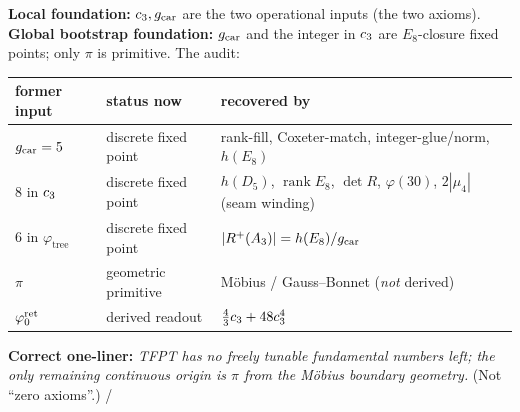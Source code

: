 \begin{keybox}
\textbf{Local foundation:} $c_3,g_{\mathrm{car}}$ are the two operational inputs (the two axioms).
\textbf{Global bootstrap foundation:} $g_{\mathrm{car}}$ and the integer in $c_3$ are $E_8$-closure fixed
points; only $\pi$ is primitive. The audit:
\begin{center}\small\renewcommand{\arraystretch}{1.2}
\begin{tabularx}{\linewidth}{@{}p{2.3cm}p{4.1cm}Y@{}}
\toprule
\textbf{former input} & \textbf{status now} & \textbf{recovered by} \\
\midrule
$g_{\mathrm{car}}=5$ & discrete fixed point & rank-fill, Coxeter-match, integer-glue/norm, $h(E_8)$ \\
$8$ in $c_3$ & discrete fixed point & $h(D_5)$, $\operatorname{rank}E_8$, $\det R$, $\varphi(30)$, $2|\mu_4|$ (seam winding) \\
$6$ in $\varphi_{\mathrm{tree}}$ & discrete fixed point & $|R^+(A_3)|=h(E_8)/g_{\mathrm{car}}$ \\
$\pi$ & geometric primitive & Möbius / Gauss--Bonnet (\emph{not} derived) \\
$\varphi_0^{\mathrm{ret}}$ & derived readout & $\tfrac43c_3+48c_3^4$ \\
\bottomrule
\end{tabularx}
\end{center}
\textbf{Correct one-liner:} \emph{TFPT has no freely tunable fundamental numbers left; the only remaining
continuous origin is $\pi$ from the Möbius boundary geometry.} (Not ``zero axioms''.) \mE/\mO
\end{keybox}

